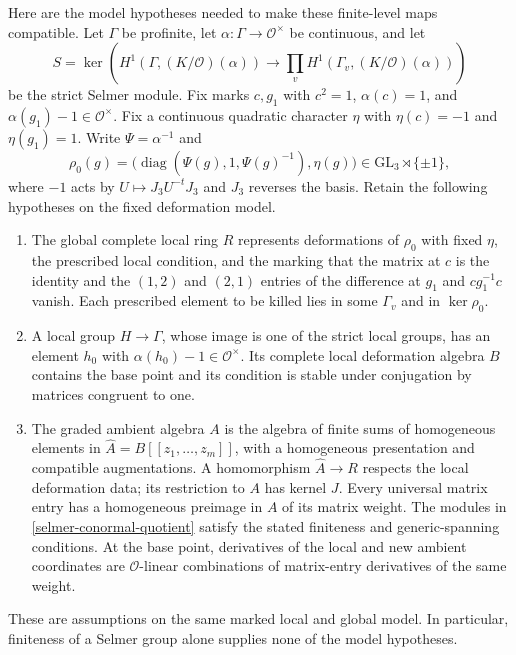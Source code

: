 Here are the model hypotheses needed to make these finite-level maps
compatible. Let $\Gamma$ be profinite, let
$\alpha:\Gamma\to\mathcal O^\times$ be continuous, and let
\[
 S=\ker\left(H^1(\Gamma,(K/\mathcal O)(\alpha))
       \longrightarrow\prod_vH^1(\Gamma_v,(K/\mathcal O)(\alpha))
       \right)
\]
be the strict Selmer module. Fix marks $c,g_1$ with
$c^2=1$, $\alpha(c)=1$, and $\alpha(g_1)-1\in\mathcal O^\times$.
Fix a continuous quadratic character $\eta$ with
$\eta(c)=-1$ and $\eta(g_1)=1$. Write $\Psi=\alpha^{-1}$ and
\[
 \rho_0(g)=
  \bigl(\operatorname{diag}(\Psi(g),1,\Psi(g)^{-1}),\eta(g)\bigr)
  \in\mathrm{GL}_3\rtimes\{\pm1\},
\]
where $-1$ acts by $U\mapsto J_3U^{-t}J_3$ and $J_3$ reverses the
basis. Retain the following hypotheses on the fixed deformation model.

\begin{enumerate}
\item The global complete local ring $R$ represents deformations of
$\rho_0$ with fixed $\eta$, the prescribed local condition, and the
marking that the matrix at $c$ is the identity and the $(1,2)$ and
$(2,1)$ entries of the difference at $g_1$ and $cg_1^{-1}c$ vanish.
Each prescribed element to be killed lies in some $\Gamma_v$ and in
$\ker\rho_0$.
\item A local group $H\to\Gamma$, whose image is one of the strict
local groups, has an element $h_0$ with
$\alpha(h_0)-1\in\mathcal O^\times$. Its complete local deformation
algebra $B$ contains the base point and its condition is stable under
conjugation by matrices congruent to one.
\item The graded ambient algebra $A$ is the algebra of finite sums of
homogeneous elements in $\widehat A=B[[z_1,\ldots,z_m]]$, with a
homogeneous presentation and compatible augmentations. A homomorphism
$\widehat A\to R$ respects the local deformation data; its restriction
to $A$ has kernel $J$. Every universal matrix entry has a homogeneous
preimage in $A$ of its matrix weight. The modules in
\eqref{selmer-conormal-quotient} satisfy the stated finiteness and
generic-spanning conditions. At the base point, derivatives of the
local and new ambient coordinates are $\mathcal O$-linear combinations
of matrix-entry derivatives of the same weight.
\end{enumerate}

These are assumptions on the same marked local and global model.
In particular, finiteness of a Selmer group alone supplies none of the
model hypotheses.


